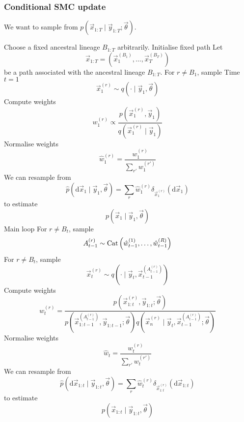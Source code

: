 \subsubsection{Conditional SMC update}
We want to sample from $p(\vec x_{1:T} \mid \vec y_{1:T}; \vec \theta)$.
    \begin{algorithmbis}\label{alg:csmc}
        \begin{algorithmic}[1]
            \State Choose a fixed ancestral lineage $B_{1:T}$ arbitrarily. \Comment Initialise fixed path
            \State Let
                $$\vec x_{1:T} = \left(\vec x_1^{(B_1)}, \dotsc, \vec x_T^{(B_T)}\right)$$
                be a path associated with the ancestral lineage $B_{1:T}$.
            \State For $r \neq B_1$, sample \Comment Time $t = 1$
                $$\vec x_1^{(r)} \sim q(\cdot \mid \vec y_1, \vec \theta)$$
            \State Compute weights
                $$w_1^{(r)} \propto \frac{p\left(\vec x_1^{(r)}, \vec y_1\right)}{q\left(\vec x_1^{(r)} \mid \vec y_1\right)}$$
            \State Normalise weights
                $$\hat w_1^{(r)} = \frac{w_1^{(r)}}{\sum_{r'} w_1^{(r')}}$$
            \State We can resample from 
                $$\hat p(\mathrm d \vec x_1 \mid \vec y_1, \vec \theta) = \sum_r \hat w_1^{(r)} \delta_{\vec x_1^{(r)}}(\mathrm d\vec x_1)$$
                to estimate
                $$p(\vec x_1 \mid \vec y_1, \vec \theta)$$
             \Comment Main loop
                \State For $r \neq B_t$, sample
                    $$A_{t - 1}^{(r)} \sim \operatorname{Cat}\left(\hat w_{t - 1}^{(1)}, \dotsc, \hat w_{t - 1}^{(R)}\right)$$
                \State For $r \neq B_t$, sample
                    $$\vec x_t^{(r)} \sim q\left(\cdot \mid \vec y_t, \vec x_{t - 1}^{(A_{t - 1}^{(r)})}\right)$$
                \State Compute weights
                    $$w_t^{(r)} = \frac{p\left(\vec x_{1:t}^{(r)}, \vec y_{1:t}; \vec \theta\right)}{p\left(\vec x_{1:t - 1}^{\left(A_{t - 1}^{(r)}\right)}, \vec y_{1:t-1}; \vec \theta\right) q\left(\vec x_n^{(r)} \mid \vec y_t, \vec x_{t - 1}^{\left(A_{t - 1}^{(r)}\right)}; \vec \theta\right)}$$
                \State Normalise weights
                    $$\hat w_t = \frac{w_t^{(r)}}{\sum_{r'} w_t^{(r')}}$$
                \State We can resample from
                    $$\hat p(\mathrm d \vec x_{1:t} \mid \vec y_{1:t}, \vec \theta) = \sum_r \hat w_t^{(r)} \delta_{\vec x_{1:t}^{(r)}}(\mathrm d \vec x_{1:t})$$
                    to estimate
                    $$p(\vec x_{1:t} \mid \vec y_{1:t}, \vec \theta)$$
            \EndFor
        \end{algorithmic}
    \end{algorithmbis}
